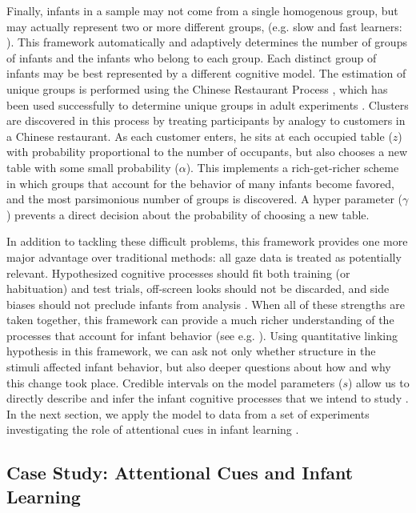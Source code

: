 \documentclass[12pt]{article}
\begin{document}
	Finally, infants in a sample may not come from a single homogenous group, but may actually represent two or more different groups, (e.g. slow and fast learners: \cite{Cashon2000, Schoner2006, Yu2011a}). This framework automatically and adaptively determines the number of groups of infants and the infants who belong to each group. Each distinct group of infants may be best represented by a different cognitive model. The estimation of unique groups is performed using the Chinese Restaurant Process \cite{Aldous1985, Rasmussen2000}, which has been used successfully to determine unique groups in adult experiments \cite{Navarro2006}. Clusters are discovered in this process by treating participants by analogy to customers in a Chinese restaurant. As each customer enters, he sits at each occupied table ($z$) with probability proportional to the number of occupants, but also chooses a new table with some small probability ($\alpha$). This implements a rich-get-richer scheme in which groups that account for the behavior of many infants become favored, and the most parsimonious number of groups is discovered. A hyper parameter ($\gamma$) prevents a direct decision about the probability of choosing a new table.

	In addition to tackling these difficult problems, this framework provides one more major advantage over traditional methods: all gaze data is treated as potentially relevant. Hypothesized cognitive processes should fit both training (or habituation) and test trials, off-screen looks should not be discarded, and side biases should not preclude infants from analysis \cite{Kelly2005, Farroni2005}. When all of these strengths are taken together, this framework can provide a much richer understanding of the processes that account for infant behavior (see e.g. \cite{Navarro2006, Lee2010a}). Using quantitative linking hypothesis in this framework, we can ask not only whether structure in the stimuli affected infant behavior, but also deeper questions about how and why this change took place. Credible intervals on the model parameters ($s$) allow us to directly describe and infer the infant cognitive processes that we intend to study \cite{Kruschke2010a}. In the next section, we apply the model to data from a set of experiments investigating the role of attentional cues in infant learning \cite{Wu2010a}.

\subsection*{Case Study: Attentional Cues and Infant Learning}
\end{document}

